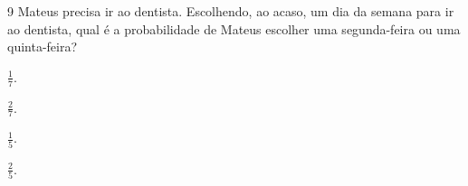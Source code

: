 

\num{9}  Mateus precisa ir ao dentista. Escolhendo, ao acaso, um dia
da semana para ir ao dentista, qual é a probabilidade de Mateus escolher
uma segunda-feira ou uma quinta-feira?

\begin{escolha}
\item $\frac{1}{7}$.
\item $\frac{2}{7}$.
\item $\frac{1}{5}$.
\item $\frac{2}{5}$.
\end{escolha}




